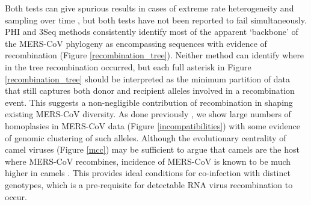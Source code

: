 \documentclass[11pt,oneside,letterpaper]{article}
\begin{document}
Both tests can give spurious results in cases of extreme rate heterogeneity and sampling over time \citep{dudas_mers-cov_2016}, but both tests have not been reported to fail simultaneously.
PHI and 3Seq methods consistently identify most of the apparent `backbone' of the MERS-CoV phylogeny as encompassing sequences with evidence of recombination (Figure \ref{recombination_tree}).
Neither method can identify where in the tree recombination occurred, but each full asterisk in Figure \ref{recombination_tree} should be interpreted as the minimum partition of data that still captures both donor and recipient alleles involved in a recombination event.
This suggests a non-negligible contribution of recombination in shaping existing MERS-CoV diversity.
As done previously \citep{dudas_mers-cov_2016}, we show large numbers of homoplasies in MERS-CoV data (Figure \ref{incompatibilities}) with some evidence of genomic clustering of such alleles.
Although the evolutionary centrality of camel viruses (Figure \ref{mcc}) may be sufficient to argue that camels are the host where MERS-CoV recombines, incidence of MERS-CoV is known to be much higher in camels \citep{muller_2014,corman_antibodies_2014,chu_2014,reusken_2014,ali_systematic_2017}.
This provides ideal conditions for co-infection with distinct genotypes, which is a pre-requisite for detectable RNA virus recombination to occur.
\end{document}
